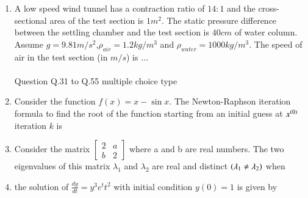 \documentclass[journal,12pt,onecolumn]{IEEEtran}
\theoremstyle{remark}
\begin{document}
\begin{enumerate}
\item  A low speed wind tunnel has a contraction ratio of $14:1$ and the cross-sectional area of the test section is $1m^2$. The static pressure difference between the settling chamber and the test section is
$40cm$ of water column. Assume $g=9.81m/s^2$,$\rho_{air}=1.2kg/m^3$ and $\rho_{water}=1000kg/m^3$. The speed of air in the test section (in $m/s$) is
$\dots$
\\ \\ 
Question Q.31 to Q.55 multiple choice type
\item Consider the function $f(x)=x-\sin x$. The Newton-Raphson iteration formula to find the root of the function starting from an initial guess at $x^{\left(0\right)}$ iteration $k$ is
\begin{enumerate}
\end{enumerate}

\item Consider the matrix 
$\begin{bmatrix}
2 & a \\
b & 2  
\end{bmatrix}$ where a and b are real numbers. The two eigenvalues of this matrix $\lambda_1$ and $\lambda_2$ are real and distinct $\left(\lambda_1 \neq \lambda_2\right)$ when 
\begin{enumerate}
\end{enumerate}

\item the solution of $\frac{dy}{dt}=y^3e^tt^2$ with initial condition $y(0)=1$ is given by
\begin{enumerate}
\end{enumerate}


\end{enumerate}
\end{document}
